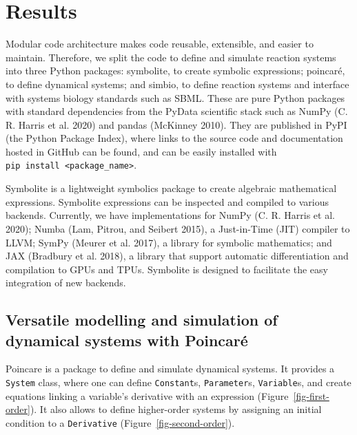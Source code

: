 \documentclass[
  a4paper,
  DIV=11,
  numbers=noendperiod]{scrartcl}
\begin{document}
\hypertarget{results}{%
\section{Results}\label{results}}

Modular code architecture makes code reusable, extensible, and easier to
maintain. Therefore, we split the code to define and simulate reaction
systems into three Python packages: symbolite, to create symbolic
expressions; poincaré, to define dynamical systems; and simbio, to
define reaction systems and interface with systems biology standards
such as SBML. These are pure Python packages with standard dependencies
from the PyData scientific stack such as NumPy (C. R. Harris et al.
2020) and pandas (McKinney 2010). They are published in PyPI (the Python
Package Index), where links to the source code and documentation hosted
in GitHub can be found, and can be easily installed with
\texttt{pip\ install\ \textless{}package\_name\textgreater{}}.

Symbolite is a lightweight symbolics package to create algebraic
mathematical expressions. Symbolite expressions can be inspected and
compiled to various backends. Currently, we have implementations for
NumPy (C. R. Harris et al. 2020); Numba (Lam, Pitrou, and Seibert 2015),
a Just-in-Time (JIT) compiler to LLVM; SymPy (Meurer et al. 2017), a
library for symbolic mathematics; and JAX (Bradbury et al. 2018), a
library that support automatic differentiation and compilation to GPUs
and TPUs. Symbolite is designed to facilitate the easy integration of
new backends.

\hypertarget{versatile-modelling-and-simulation-of-dynamical-systems-with-poincaruxe9}{%
\subsection{Versatile modelling and simulation of dynamical systems with
Poincaré}\label{versatile-modelling-and-simulation-of-dynamical-systems-with-poincaruxe9}}



Poincare is a package to define and simulate dynamical systems. It
provides a \texttt{System} class, where one can define
\texttt{Constant}s, \texttt{Parameter}s, \texttt{Variable}s, and create
equations linking a variable's derivative with an expression
(Figure~\ref{fig-first-order}). It also allows to define higher-order
systems by assigning an initial condition to a \texttt{Derivative}
(Figure~\ref{fig-second-order}).
\end{document}
